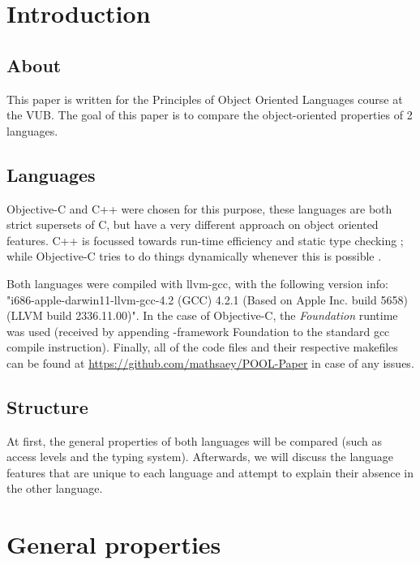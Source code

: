 \documentclass[12pt, a4paper, twocolumn]{article}
\begin{document}
\setlength{\parindent}{0pt}
\setlength{\parskip}{1ex}


\tableofcontents

\section{Introduction}
\subsection{About}
This paper is written for the Principles of Object Oriented Languages course at the VUB. The goal of this paper is to compare the object-oriented properties of 2 languages. 

\subsection{Languages}
Objective-C and C++ were chosen for this purpose, these languages are both strict supersets of C, but have a very different approach on object oriented features. C++ is focussed towards run-time efficiency and static type checking \cite{CPdesc}; while Objective-C tries to do things dynamically whenever this is possible \cite{OCRPG}.

Both languages were compiled with llvm-gcc, with the following version info: "i686-apple-darwin11-llvm-gcc-4.2 (GCC) 4.2.1 (Based on Apple Inc. build 5658) (LLVM build 2336.11.00)". In the case of Objective-C, the \textit{Foundation} runtime was used (received by appending -framework Foundation to the standard gcc compile instruction). Finally, all of the code files and their respective makefiles can be found at \url{https://github.com/mathsaey/POOL-Paper} in case of any issues.

\subsection{Structure}
At first, the general properties of both languages will be compared (such as access levels and the typing system). Afterwards, we will discuss the language features that are unique to each language and attempt to explain their absence in the other language.

\section{General properties}
\label{sec:general}
\end{document}
